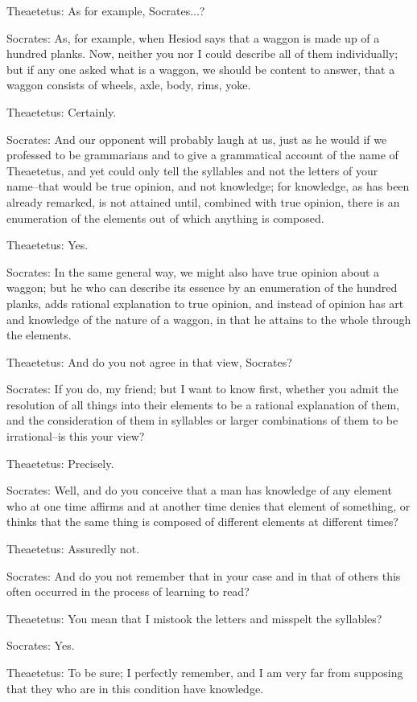 Theaetetus: As for example, Socrates...?

Socrates: As, for example, when Hesiod says that a waggon is made up
of a hundred planks. Now, neither you nor I could describe all of
them individually; but if any one asked what is a waggon, we should be
content to answer, that a waggon consists of wheels, axle, body, rims,
yoke.

Theaetetus: Certainly.

Socrates: And our opponent will probably laugh at us, just as he would
if we professed to be grammarians and to give a grammatical account of
the name of Theaetetus, and yet could only tell the syllables and not
the letters of your name--that would be true opinion, and not knowledge;
for knowledge, as has been already remarked, is not attained until,
combined with true opinion, there is an enumeration of the elements out
of which anything is composed.

Theaetetus: Yes.

Socrates: In the same general way, we might also have true opinion about
a waggon; but he who can describe its essence by an enumeration of the
hundred planks, adds rational explanation to true opinion, and instead
of opinion has art and knowledge of the nature of a waggon, in that he
attains to the whole through the elements.

Theaetetus: And do you not agree in that view, Socrates?

Socrates: If you do, my friend; but I want to know first, whether you
admit the resolution of all things into their elements to be a rational
explanation of them, and the consideration of them in syllables or
larger combinations of them to be irrational--is this your view?

Theaetetus: Precisely.

Socrates: Well, and do you conceive that a man has knowledge of any
element who at one time affirms and at another time denies that element
of something, or thinks that the same thing is composed of different
elements at different times?

Theaetetus: Assuredly not.

Socrates: And do you not remember that in your case and in that of
others this often occurred in the process of learning to read?

Theaetetus: You mean that I mistook the letters and misspelt the
syllables?

Socrates: Yes.

Theaetetus: To be sure; I perfectly remember, and I am very far from
supposing that they who are in this condition have knowledge.

